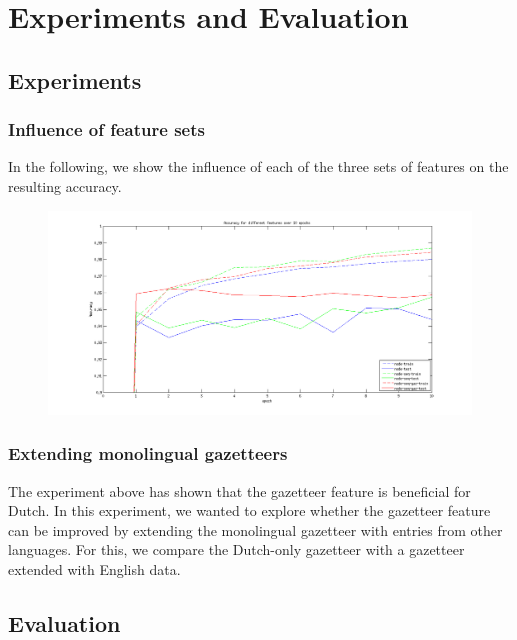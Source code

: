 \documentclass[11pt]{article}
\begin{document}
\section{Experiments and Evaluation}

\subsection{Experiments}

\subsubsection{Influence of feature sets}

In the following, we show the influence of each of the three sets of features on the resulting accuracy.
\FloatBarrier
\begin{figure}[t!]
\centering
 \includegraphics[scale=0.5]{Plot.png}
\end{figure}


\subsubsection{Extending monolingual gazetteers}

The experiment above has shown that the gazetteer feature is beneficial for Dutch. In this experiment, we wanted to explore whether the 
gazetteer feature can be improved by extending the monolingual gazetteer with entries from other languages. For this, we compare the 
Dutch-only gazetteer with a gazetteer extended with English data.



\subsection{Evaluation}
\end{document}
